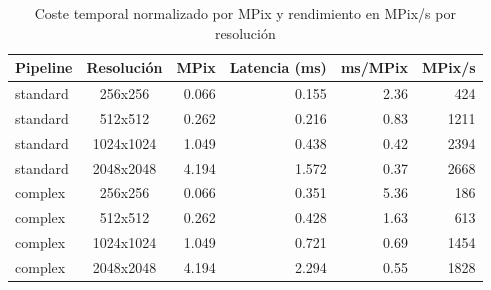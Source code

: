 \begin{table}[htbp]
\centering
\renewcommand{\arraystretch}{1.2}
\setlength{\tabcolsep}{5pt}
\begin{tabular}{|l|c|r|r|r|r|}
\hline
\rowcolor[gray]{0.90}
\textbf{Pipeline} & \textbf{Resolución} & \textbf{MPix} & \textbf{Latencia (ms)} & \textbf{ms/MPix} & \textbf{MPix/s} \\
\hline
standard & 256x256 & 0.066 & 0.155 & 2.36 & 424 \\
\hline
standard & 512x512 & 0.262 & 0.216 & 0.83 & 1211 \\
\hline
standard & 1024x1024 & 1.049 & 0.438 & 0.42 & 2394 \\
\hline
standard & 2048x2048 & 4.194 & 1.572 & 0.37 & 2668 \\
\hline
complex & 256x256 & 0.066 & 0.351 & 5.36 & 186 \\
\hline
complex & 512x512 & 0.262 & 0.428 & 1.63 & 613 \\
\hline
complex & 1024x1024 & 1.049 & 0.721 & 0.69 & 1454 \\
\hline
complex & 2048x2048 & 4.194 & 2.294 & 0.55 & 1828 \\
\hline
\end{tabular}
\caption{Coste temporal normalizado por MPix y rendimiento en MPix/s por resolución}
\label{tab:resolution_mpix_efficiency_equipo1_float32}
\end{table}
